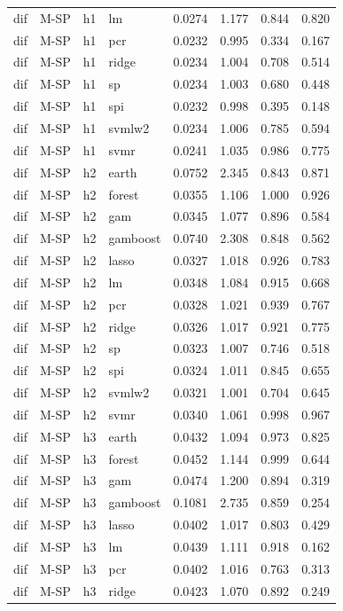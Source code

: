 \begin{ThreePartTable}
\begin{longtable}[t]{llclcccc}
dif & M-SP & h1 & lm & 0.0274 & 1.177 & 0.844 & 0.820\\
dif & M-SP & h1 & pcr & 0.0232 & 0.995 & 0.334 & 0.167\\
dif & M-SP & h1 & ridge & 0.0234 & 1.004 & 0.708 & 0.514\\
dif & M-SP & h1 & sp & 0.0234 & 1.003 & 0.680 & 0.448\\
dif & M-SP & h1 & spi & 0.0232 & 0.998 & 0.395 & 0.148\\
dif & M-SP & h1 & svmlw2 & 0.0234 & 1.006 & 0.785 & 0.594\\
dif & M-SP & h1 & svmr & 0.0241 & 1.035 & 0.986 & 0.775\\
\addlinespace
dif & M-SP & h2 & earth & 0.0752 & 2.345 & 0.843 & 0.871\\
dif & M-SP & h2 & forest & 0.0355 & 1.106 & 1.000 & 0.926\\
dif & M-SP & h2 & gam & 0.0345 & 1.077 & 0.896 & 0.584\\
dif & M-SP & h2 & gamboost & 0.0740 & 2.308 & 0.848 & 0.562\\
dif & M-SP & h2 & lasso & 0.0327 & 1.018 & 0.926 & 0.783\\
dif & M-SP & h2 & lm & 0.0348 & 1.084 & 0.915 & 0.668\\
dif & M-SP & h2 & pcr & 0.0328 & 1.021 & 0.939 & 0.767\\
dif & M-SP & h2 & ridge & 0.0326 & 1.017 & 0.921 & 0.775\\
dif & M-SP & h2 & sp & 0.0323 & 1.007 & 0.746 & 0.518\\
dif & M-SP & h2 & spi & 0.0324 & 1.011 & 0.845 & 0.655\\
dif & M-SP & h2 & svmlw2 & 0.0321 & 1.001 & 0.704 & 0.645\\
dif & M-SP & h2 & svmr & 0.0340 & 1.061 & 0.998 & 0.967\\
\addlinespace
dif & M-SP & h3 & earth & 0.0432 & 1.094 & 0.973 & 0.825\\
dif & M-SP & h3 & forest & 0.0452 & 1.144 & 0.999 & 0.644\\
dif & M-SP & h3 & gam & 0.0474 & 1.200 & 0.894 & 0.319\\
dif & M-SP & h3 & gamboost & 0.1081 & 2.735 & 0.859 & 0.254\\
dif & M-SP & h3 & lasso & 0.0402 & 1.017 & 0.803 & 0.429\\
dif & M-SP & h3 & lm & 0.0439 & 1.111 & 0.918 & 0.162\\
dif & M-SP & h3 & pcr & 0.0402 & 1.016 & 0.763 & 0.313\\
dif & M-SP & h3 & ridge & 0.0423 & 1.070 & 0.892 & 0.249\\

\end{longtable}
\end{ThreePartTable}
